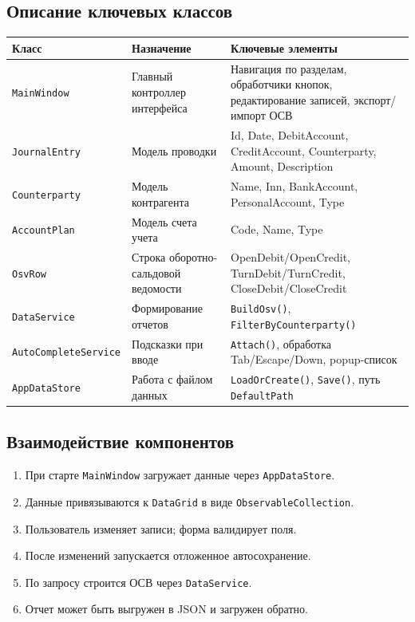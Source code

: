 \documentclass[14pt,a4paper]{extarticle}
\begin{document}
\subsection{Описание ключевых классов}
\begin{longtable}{|p{3.6cm}|p{4.4cm}|p{6.8cm}|}
\hline
\textbf{Класс} & \textbf{Назначение} & \textbf{Ключевые элементы} \\
\hline
\texttt{MainWindow} & Главный контроллер интерфейса & Навигация по разделам, обработчики кнопок, редактирование записей, экспорт/импорт ОСВ \\
\hline
\texttt{JournalEntry} & Модель проводки & Id, Date, DebitAccount, CreditAccount, Counterparty, Amount, Description \\
\hline
\texttt{Counterparty} & Модель контрагента & Name, Inn, BankAccount, PersonalAccount, Type \\
\hline
\texttt{AccountPlan} & Модель счета учета & Code, Name, Type \\
\hline
\texttt{OsvRow} & Строка оборотно-сальдовой ведомости & OpenDebit/OpenCredit, TurnDebit/TurnCredit, CloseDebit/CloseCredit \\
\hline
\texttt{DataService} & Формирование отчетов & \texttt{BuildOsv()}, \texttt{FilterByCounterparty()} \\
\hline
\texttt{AutoCompleteService} & Подсказки при вводе & \texttt{Attach()}, обработка Tab/Escape/Down, popup-список \\
\hline
\texttt{AppDataStore} & Работа с файлом данных & \texttt{LoadOrCreate()}, \texttt{Save()}, путь \texttt{DefaultPath} \\
\hline
\end{longtable}

\subsection{Взаимодействие компонентов}
\begin{enumerate}
    \item При старте \texttt{MainWindow} загружает данные через \texttt{AppDataStore}.
    \item Данные привязываются к \texttt{DataGrid} в виде \texttt{ObservableCollection}.
    \item Пользователь изменяет записи; форма валидирует поля.
    \item После изменений запускается отложенное автосохранение.
    \item По запросу строится ОСВ через \texttt{DataService}.
    \item Отчет может быть выгружен в JSON и загружен обратно.
\end{enumerate}
\end{document}
